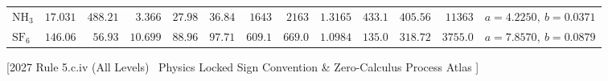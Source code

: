 \documentclass[10pt,twoside,openany,letterpaper]{book}
\begin{document}
\begin{quicksheet}
\begin{formulacard}
\begin{tabularx}{\linewidth}{@{}l r r r r r r r r r r r r@{}}
$\mathrm{NH_3}$ & $17.031$ & $488.21$ & $3.366$ & $27.98$ & $36.84$ & $1643$ & $2163$ & $1.3165$ & $433.1$ & $405.56$ & $11363$ & $a=4.2250,\ b=0.0371$ \\
$\mathrm{SF_6}$ & $146.06$ & $56.93$ & $\mathbf{10.699}$ & $88.96$ & $97.71$ & $609.1$ & $669.0$ & $1.0984$ & $135.0$ & $318.72$ & $3755.0$ & $a=7.8570,\ b=0.0879$ \\
\bottomrule
\end{tabularx}
\end{formulacard}
\end{quicksheet}

\begin{quicksheet}[QR-07 --- First Law ($\Delta U = Q - W_{\mathrm{by}}$), Master 8-Process Atlas \& Steady-Flow SFEE]\label{qr:07}
[2027 Rule 5.c.iv (All Levels) \textbar\ Physics Locked Sign Convention \& Zero-Calculus Process Atlas ]


\end{quicksheet}
\end{document}
